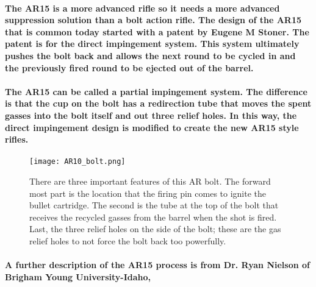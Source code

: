 \paragraph{The AR15 is a more advanced rifle so it needs a more advanced suppression solution than a bolt action rifle. The design of the AR15 that is common today started with a patent by Eugene M Stoner. The patent is for the direct impingement system. This system ultimately pushes the bolt back and allows the next round to be cycled in and the previously fired round to be ejected out of the barrel.\cite{waybackit2010}}







\paragraph{The AR15 can be called a partial impingement system. The difference is that the cup on the bolt has a redirection tube that moves the spent gasses into the bolt itself and out three relief holes. In this way, the direct impingement design is modified to create the new AR15 style rifles.}

\begin{figure}[!h]
	\centering
	\texttt{[image: AR10\_bolt.png]}
	\caption[Bolt design]{There are three important features of this AR bolt. The forward most part is the location that the firing pin comes to ignite the bullet cartridge. The second is the tube at the top of the bolt that receives the recycled gasses from the barrel when the shot is fired. Last, the three relief holes on the side of the bolt; these are the gas relief holes to not force the bolt back too powerfully.\cite{commonswikimedia}}
	\label{fig:AR bolt}
\end{figure}

\paragraph{A further description of the AR15 process is from Dr. Ryan Nielson of Brigham Young University-Idaho,}

